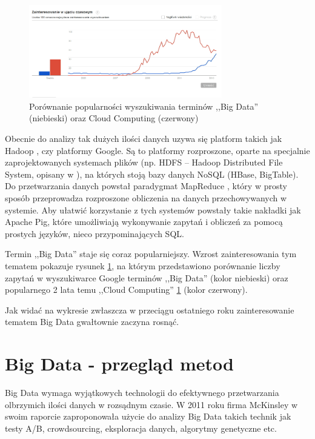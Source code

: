 \documentclass[twocolumn]{svjour3}          %
\begin{document}
\begin{figure}
    \centerline{\includegraphics[width=0.75\textwidth]{obrazki/trend-big-data_cloud-computing.png}}
    \caption{Porównanie popularności wyszukiwania terminów ,,Big Data'' (niebieski) oraz Cloud Computing (czerwony)}
    \label{fig:big_data_popularnosc}       %
\end{figure}

Obecnie do analizy tak dużych ilości danych uzywa się platform takich jak Hadoop \cite{apache:hadoop}, czy platformy Google. Są to platformy rozproszone, oparte na specjalnie zaprojektowanych systemach plików (np. HDFS -- Hadoop Distributed File System, opisany w \cite{shvachko10}), na których stoją bazy danych NoSQL (HBase, BigTable). Do przetwarzania danych powstał paradygmat MapReduce \cite{dean08}, który w prosty sposób przeprowadza rozproszone obliczenia na danych przechowywanych w systemie. Aby ułatwić korzystanie z tych systemów powstały takie nakładki jak Apache Pig, które umożliwiają wykonywanie zapytań i obliczeń za pomocą prostych języków, nieco przypominających SQL.

Termin ,,Big Data'' staje się coraz popularniejszy. Wzrost zainteresowania tym tematem pokazuje rysunek \ref{fig:big_data_popularnosc}, na którym przedstawiono porównanie liczby zapytań w wyszukiwarce Google terminów ,,Big Data'' (kolor niebieski) oraz popularnego 2 lata temu ,,Cloud Computing'' \ref{fig:big_data_popularnosc} (kolor czerwony).



Jak widać na wykresie zwłaszcza w przeciągu ostatniego roku zainteresowanie tematem Big Data gwałtownie zaczyna rosnąć.


\section{Big Data - przegląd metod}
\label{sub:metody}
Big Data wymaga wyjątkowych technologii do efektywnego przetwarzania olbrzymich ilości danych w rozsądnym czasie. W 2011 roku firma {McKinsley} w swoim raporcie \cite{McKinsey2011} zaproponowała użycie do analizy Big Data takich technik jak testy A/B, crowdsourcing, eksploracja danych, algorytmy genetyczne etc.
\end{document}
